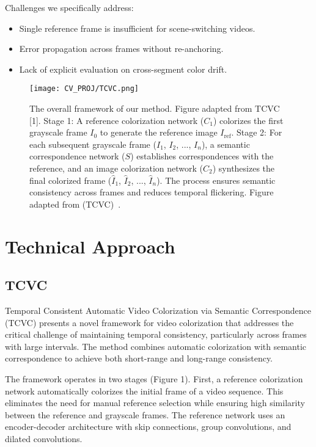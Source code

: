 \documentclass[10pt,twocolumn,letterpaper]{article}
\begin{document}
Challenges we specifically address:
\begin{itemize}
    \item Single reference frame is insufficient for scene-switching videos.
    \item Error propagation across frames without re-anchoring.
    \item Lack of explicit evaluation on cross-segment color drift.
\end{itemize}

\begin{figure*}[ht]
    \centering
    \texttt{[image: CV\_PROJ/TCVC.png]}
    \caption{The overall framework of our method. Figure adapted from TCVC [1].  Stage 1: A reference colorization network ($C_1$) colorizes the first grayscale frame $I_0$ to generate the reference image $I_{\text{ref}}$. Stage 2: For each subsequent grayscale frame ($I_1$, $I_2$, ..., $I_n$), a semantic correspondence network ($S$) establishes correspondences with the reference, and an image colorization network ($C_2$) synthesizes the final colorized frame ($\hat{I}_1$, $\hat{I}_2$, ..., $\hat{I}_n$). The process ensures semantic consistency across frames and reduces temporal flickering. Figure adapted from{ (TCVC)}~\cite{zhang2023temporal}.}
    \label{fig:tcvc_overall}
\end{figure*}

\section{Technical Approach}
\subsection{TCVC \cite{zhang2023temporal}}
Temporal Consistent Automatic Video Colorization via Semantic Correspondence (TCVC) \cite{zhang2023temporal} presents a novel framework for video colorization that addresses the critical challenge of maintaining temporal consistency, particularly across frames with large intervals. The method combines automatic colorization with semantic correspondence to achieve both short-range and long-range consistency.

The framework operates in two stages (Figure 1). First, a reference colorization network automatically colorizes the initial frame of a video sequence. This eliminates the need for manual reference selection while ensuring high similarity between the reference and grayscale frames. The reference network uses an encoder-decoder architecture with skip connections, group convolutions, and dilated convolutions.
\end{document}
